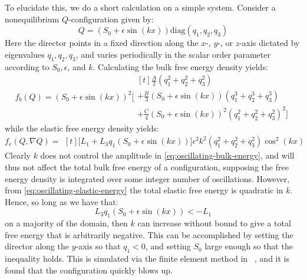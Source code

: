 \documentclass[reqno]{article}
\begin{document}
  To elucidate this, we do a short calculation on a simple system.
  Consider a nonequilibrium $Q$-configuration given by:
  \begin{equation}
    Q
    =
    \left( S_0 + \epsilon \sin(kx) \right)
    \text{diag}(q_1, q_2, q_3)
  \end{equation}
  Here the director points in a fixed direction along the $x$-, $y$-, or
  $z$-axis dictated by eigenvalues $q_1, q_2,
  q_3$, and varies periodically in the scalar order parameter according to $S_0, \epsilon$,
  and $k$.
  Calculating the bulk free energy density yields:
  \begin{equation}\label{eq:oscillating-bulk-energy}
    f_b(Q)
    =
    \left(S_{0} + \epsilon \sin{\left(k x \right)}\right)^{2}
    \bigl[
    \begin{multlined}[t]
      \tfrac{A}{2} \left(q_{1}^{2} + q_{2}^{2} + q_{3}^{2}\right) \\
      + \tfrac{B}{3} \left(S_{0} + \epsilon \sin{\left(k x \right)}\right) \left(q_{1}^{3} + q_{2}^{3} + q_{3}^{3}\right) \\
      + \tfrac{C}{4} \left(S_{0} + \epsilon \sin{\left(k x \right)}\right)^{2} \left(q_{1}^{2} + q_{2}^{2} + q_{3}^{2}\right)^{2}
      \bigr]
    \end{multlined}
  \end{equation}
  while the elastic free energy density yields:
  \begin{equation} \label{eq:oscillating-elastic-energy}
    f_e(Q, \nabla Q)
    =
    \begin{multlined}[t]
      \bigl[
      L_{1}
      + L_{3} q_{1} \left(S_{0} + \epsilon \sin{\left(k x \right)}\right)
      \bigr]
      \epsilon^{2} k^{2}
      \left(q_{1}^{2} + q_{2}^{2} + q_{3}^{2}\right)
      \cos^{2}{\left(k x \right)}
    \end{multlined}
  \end{equation}
  Clearly $k$ does not control the amplitude in
  \ref{eq:oscillating-bulk-energy}, and will thus not affect the total bulk free
  energy of a configuration, supposing the free energy density is integrated
  over some integer number of oscillations.
  However, from \ref{eq:oscillating-elastic-energy} the total elastic free
  energy is quadratic in $k$.
  Hence, so long as we have that:
  \begin{equation}
    L_3 q_1(S_0 + \epsilon \sin(kx)) < -L_1
  \end{equation}
  on a majority of the domain, then $k$ can increase without bound to give a
  total free energy that is arbitrarily negative.
  This can be accomplished by setting the director along the $y$-axis so that
  $q_1 < 0$, and setting $S_0$ large enough so that the inequality holds.
  This is simulated via the finite element method in
  ~\cite{schimming_numerical_2021}, and it is found that the configuration
  quickly blows up.
\end{document}
